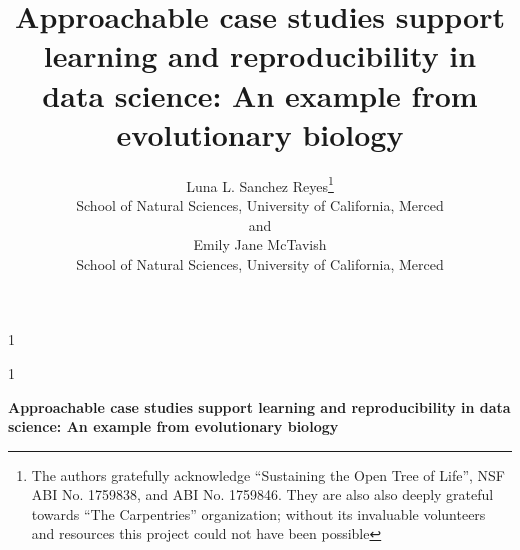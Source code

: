 \documentclass[12pt]{article}
\newcommand{\blind}{1}
\begin{document}
%
%


\def\spacingset#1{\renewcommand{\baselinestretch}%
{#1}\small\normalsize} \spacingset{1}



\blind
{
  \title{\bf Approachable case studies support learning and reproducibility in data science: An example from evolutionary biology}
  \author{Luna L. Sanchez Reyes\thanks{
    The authors gratefully acknowledge ``Sustaining the Open Tree of Life'',
    NSF ABI No. 1759838, and ABI No. 1759846. They are also also deeply grateful towards
    ``The Carpentries'' organization; without its invaluable volunteers and resources
    this project could not have been possible}\hspace{.2cm}\\
    School of Natural Sciences, University of California, Merced\\
    and \\
    Emily Jane McTavish \\
    School of Natural Sciences, University of California, Merced}
  \maketitle
} \fi

\blind
{
  \bigskip
  \bigskip
  \bigskip
  \begin{center}
    {\LARGE\bf Approachable case studies support learning and reproducibility in data science: An example from evolutionary biology}
\end{center}
  \medskip
} \fi
\end{document}
